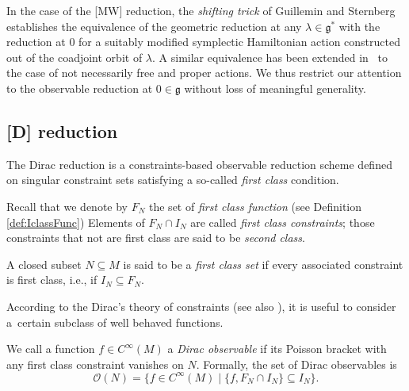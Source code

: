 \documentclass[pdftex]{sigma}
\numberwithin{equation}{section}
\renewcommand{\subset}{\subseteq}
\begin{document}
\begin{Remark}
In the case of the [MW] reduction, the \emph{shifting trick} of Guillemin and Sternberg \cite{GuilleminSternberg90} establishes the equivalence of the geometric reduction at any $\lambda\in \mathfrak{g}^*$ with the reduction at $0$ for a suitably modified symplectic Hamiltonian action constructed out of the coadjoint orbit of $\lambda$.
A similar equivalence has been extended in~\cite{Arms96} to the case of not necessarily free and proper actions.
	We thus restrict our attention to the observable reduction at $0\in \mathfrak{g}$ without loss of meaningful generality.
\end{Remark}


\subsection{{[D]} reduction}%

The Dirac reduction is a constraints-based observable reduction scheme defined on singular constraint sets satisfying a so-called \emph{first class} condition.

Recall that we denote by $F_N$ the set of \emph{first class function} (see Definition \ref{def:IclassFunc})
Elements of $F_N \cap I_N$ are called \emph{first class constraints}; those constraints that not are first class are said to be \emph{second class}.

\begin{Definition}
	A closed subset $N\subset M$ is said to be a \emph{first class set} if every associated constraint is first class, i.e., if $I_N\subset F_N$.
\end{Definition}

According to the Dirac's theory of constraints \cite{Dirac64} (see  also \cite{Sniatycki83}), it is useful to consider a~certain subclass of well behaved functions.
\begin{Definition}\label{def:Dirac_observables}
	We call a function $f\in C^\infty(M)$ a \emph{Dirac observable} if its Poisson bracket with any first class constraint vanishes on $N$. Formally, the set of Dirac observables is
	\begin{displaymath}
		\mathcal{O}(N) =
		\lbrace
 		f \in C^\infty(M)
 		\mid
		\lbrace f, F_N\cap I_N \rbrace \subset I_N
		\rbrace.
	\end{displaymath}
\end{Definition}
\end{document}
